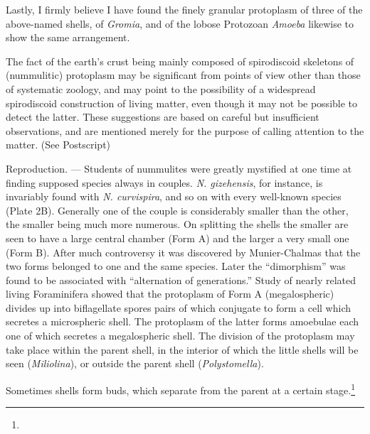 \documentclass[a4paper, 12pt, oneside]{article}
\begin{document}
Lastly, I firmly believe I have found the finely granular protoplasm of three of the above-named shells, of \emph{Gromia}, and of the lobose Protozoan \emph{Amoeba} likewise to show the same arrangement.

The fact of the earth's crust being mainly composed of spirodiscoid skeletons of (nummulitic) protoplasm may be significant from points of view other than those of systematic zoology, and may point to the possibility of a widespread spirodiscoid construction of living matter, even though it may not be possible to detect the latter. These suggestions are based on careful but insufficient observations, and are mentioned merely for the purpose of calling attention to the matter. (See Postscript)

Reproduction. --- Students of nummulites were greatly mystified at one time at finding supposed species always in couples. \emph{N. gizehensis}, for instance, is invariably found with \emph{N. curvispira}, and so on with every well-known species (Plate 2B). Generally one of the couple is considerably smaller than the other, the smaller being much more numerous. On splitting the shells the smaller are seen to have a large central chamber (Form A) and the larger a very small one (Form B). After much controversy it was discovered by Munier-Chalmas that the two forms belonged to one and the same species. Later the ``dimorphism'' was found to be associated with ``alternation of generations.'' Study of nearly related living Foraminifera showed that the protoplasm of Form A (megalospheric) divides up into biflagellate spores pairs of which conjugate to form a cell which secretes a microspheric shell. The protoplasm of the latter forms amoebulae each one of which secretes a megalospheric shell. The division of the protoplasm may take place within the parent shell, in the interior of which the little shells will be seen (\emph{Miliolina}), or outside the parent shell (\emph{Polystomella}).

Sometimes shells form buds, which separate from the parent at a certain stage.\footnote{}
\end{document}
